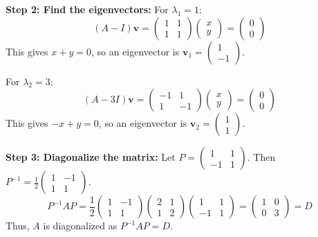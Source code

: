 \textbf{Step 2: Find the eigenvectors:}
    For \(\lambda_1 = 1\):
    \[
    (A - I)\mathbf{v} = \begin{pmatrix}
    1 & 1 \\
    1 & 1
    \end{pmatrix} \begin{pmatrix}
    x \\
    y
    \end{pmatrix} = \begin{pmatrix}
    0 \\
    0
    \end{pmatrix}
    \]
    This gives \(x + y = 0\), so an eigenvector is \(\mathbf{v}_1 = \begin{pmatrix} 1 \\ -1 \end{pmatrix}\).

    For \(\lambda_2 = 3\):
    \[
    (A - 3I)\mathbf{v} = \begin{pmatrix}
    -1 & 1 \\
    1 & -1
    \end{pmatrix} \begin{pmatrix}
    x \\
    y
    \end{pmatrix} = \begin{pmatrix}
    0 \\
    0
    \end{pmatrix}
    \]
    This gives \(-x + y = 0\), so an eigenvector is \(\mathbf{v}_2 = \begin{pmatrix} 1 \\ 1 \end{pmatrix}\).

\textbf{Step 3: Diagonalize the matrix:}
    Let \(P = \begin{pmatrix} 1 & 1 \\ -1 & 1 \end{pmatrix}\). Then \(P^{-1} = \frac{1}{2} \begin{pmatrix} 1 & -1 \\ 1 & 1 \end{pmatrix}\).
    \[
    P^{-1}AP = \frac{1}{2} \begin{pmatrix} 1 & -1 \\ 1 & 1 \end{pmatrix} \begin{pmatrix} 2 & 1 \\ 1 & 2 \end{pmatrix} \begin{pmatrix} 1 & 1 \\ -1 & 1 \end{pmatrix} = \begin{pmatrix} 1 & 0 \\ 0 & 3 \end{pmatrix} = D
    \]
    Thus, \(A\) is diagonalized as \(P^{-1}AP = D\).
